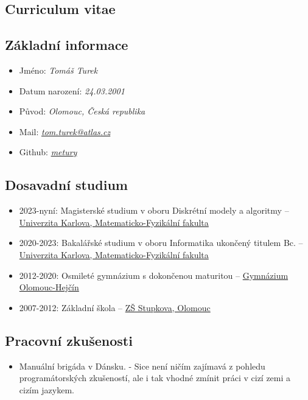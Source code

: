 \documentclass{article}
\begin{document}
\begin{center}
	\section*{Curriculum vitae}
\end{center}

\subsection*{Základní informace}

\begin{itemize}
	\item Jméno: \textit{Tomáš Turek}
	\item Datum narození: \textit{24.03.2001}
	\item Původ: \textit{Olomouc, Česká republika}
	\item Mail: \href{mailto:tom.turek@atlas.cz}{\textit{tom.turek@atlas.cz}}
	\item Github: \href{https://github.com/metury}{\textit{metury}}
\end{itemize}

\subsection*{Dosavadní studium}

\begin{itemize}
	\item 2023-nyní: Magisterské studium v oboru Diskrétní modely a algoritmy -- \href{https://www.mff.cuni.cz/}{Univerzita Karlova, Matematicko-Fyzikální fakulta}
	\item 2020-2023: Bakalářské studium v oboru Informatika ukončený titulem Bc. -- \href{https://www.mff.cuni.cz/}{Univerzita Karlova, Matematicko-Fyzikální fakulta}
	\item 2012-2020: Osmileté gymnázium s dokončenou maturitou -- \href{https://www.gytool.cz/}{Gymnázium Olomouc-Hejčín} 
	\item 2007-2012: Základní škola -- \href{https://zsstupkova.cz/}{ZŠ Stupkova, Olomouc}
\end{itemize}

\subsection*{Pracovní zkušenosti}

\begin{itemize}
\item Manuální brigáda v Dánsku. - Sice není ničím zajímavá z pohledu programátorských zkušeností, ale i tak vhodné zmínit práci v cizí zemi a cizím jazykem.
\end{itemize}
\end{document}

